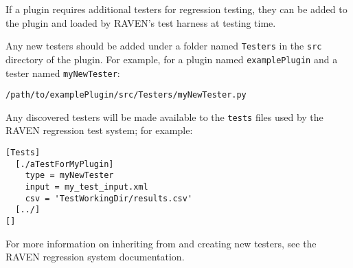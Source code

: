 If a plugin requires additional testers for regression testing, they can be added to the plugin and
loaded by RAVEN's test harness at testing time.

Any new testers should be added under a folder named \texttt{Testers} in the \texttt{src} directory
of the plugin. For example, for a plugin named \texttt{examplePlugin} and a tester named
\texttt{myNewTester}:
\begin{lstlisting}[morekeywords={examplePlugin,myNewTester}]
  /path/to/examplePlugin/src/Testers/myNewTester.py
\end{lstlisting}
Any discovered testers will be made available to the \texttt{tests} files used by the RAVEN
regression test system; for example:
\begin{lstlisting}[morekeywords={myNewTester}]
[Tests]
  [./aTestForMyPlugin]
    type = myNewTester
    input = my_test_input.xml
    csv = 'TestWorkingDir/results.csv'
  [../]
[]
\end{lstlisting}

For more information on inheriting from and creating new testers, see the RAVEN regression system
documentation.